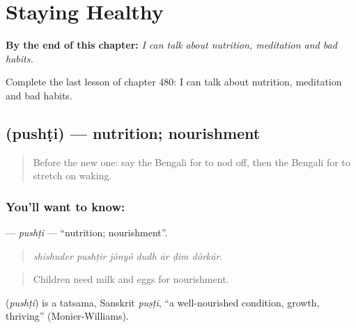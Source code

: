 
\chapter{Staying Healthy}
\label{ch:bn-staying-healthy}

\begin{chapteropening}
\textbf{By the end of this chapter:} \emph{I can talk about nutrition, meditation and bad habits.}

Complete the last lesson of chapter 480: I can talk about nutrition, meditation and bad habits.
\end{chapteropening}

\section[\texorpdfstring{\bn{পুষ্টি} (pushṭi)}{পুষ্টি (pushṭi)}]{ (pushṭi) — nutrition; nourishment}

\label{lesson:BN-C480-pushti}



\begin{quote}
Before the new one: say the Bengali for to nod off, then the Bengali for to stretch on waking.
\end{quote}

\subsection*{You'll want to know: }
\textbf{} — \emph{pushṭi} — \textquotedblleft{}nutrition; nourishment\textquotedblright{}.

\begin{quote}
      
\end{quote}

\begin{quote}
\emph{shishuder pushṭir jônyô dudh ār ḍim dôrkār.}
\end{quote}

\begin{quote}
Children need milk and eggs for nourishment.
\end{quote}

\begin{cousinweb}
\textbf{} (\emph{pushṭi}) is a tatsama, Sanskrit \emph{puṣṭi}, \textquotedblleft{}a well-nourished condition, growth, thriving\textquotedblright{} (Monier-Williams).
\end{cousinweb}

